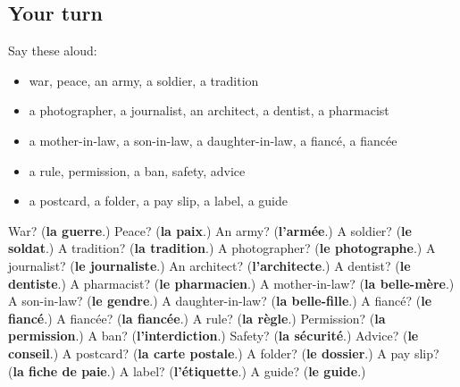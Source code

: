 \subsection*{Your turn}
Say these aloud:

\begin{itemize}
\raggedright
  \item war, peace, an army, a soldier, a tradition
  \item a photographer, a journalist, an architect, a dentist, a pharmacist
  \item a mother-in-law, a son-in-law, a daughter-in-law, a fiancé, a fiancée
  \item a rule, permission, a ban, safety, advice
  \item a postcard, a folder, a pay slip, a label, a guide
\end{itemize}

\begin{tcolorbox}[breakable,colback=teal!4,colframe=teal!35!black,title={Before you move on}]
War? (\textbf{la guerre}.) Peace? (\textbf{la paix}.) An army? (\textbf{l'armée}.) A soldier? (\textbf{le soldat}.) A tradition? (\textbf{la tradition}.) A photographer? (\textbf{le photographe}.) A journalist? (\textbf{le journaliste}.) An architect? (\textbf{l'architecte}.) A dentist? (\textbf{le dentiste}.) A pharmacist? (\textbf{le pharmacien}.) A mother-in-law? (\textbf{la belle-mère}.) A son-in-law? (\textbf{le gendre}.) A daughter-in-law? (\textbf{la belle-fille}.) A fiancé? (\textbf{le fiancé}.) A fiancée? (\textbf{la fiancée}.) A rule? (\textbf{la règle}.) Permission? (\textbf{la permission}.) A ban? (\textbf{l'interdiction}.) Safety? (\textbf{la sécurité}.) Advice? (\textbf{le conseil}.) A postcard? (\textbf{la carte postale}.) A folder? (\textbf{le dossier}.) A pay slip? (\textbf{la fiche de paie}.) A label? (\textbf{l'étiquette}.) A guide? (\textbf{le guide}.)
\end{tcolorbox}
